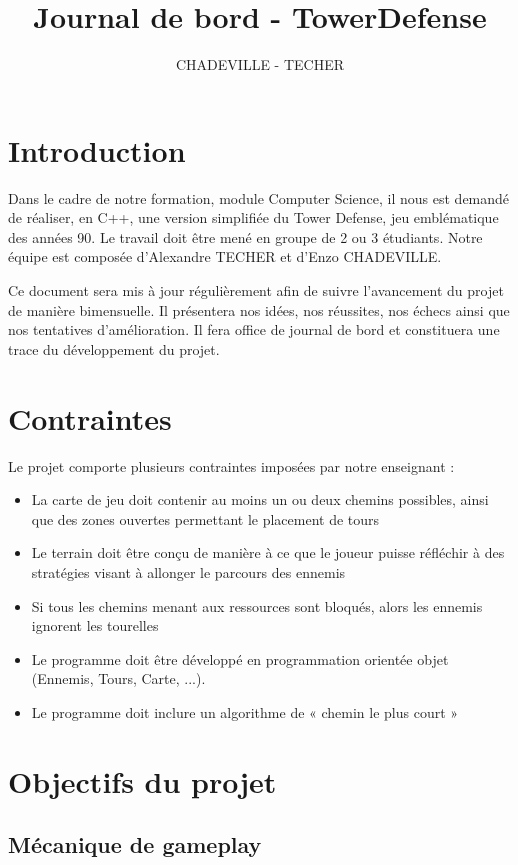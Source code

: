 \documentclass{article}
\title{Journal de bord - TowerDefense}
\author{CHADEVILLE - TECHER}
\begin{document}
\maketitle


\section{Introduction}

Dans le cadre de notre formation, module Computer Science, il nous est demandé de réaliser, en C++, une version simplifiée du Tower Defense, jeu emblématique des années 90. Le travail doit être mené en groupe de 2 ou 3 étudiants. Notre équipe est composée d’Alexandre TECHER et d’Enzo CHADEVILLE.

Ce document sera mis à jour régulièrement afin de suivre l’avancement du projet de manière bimensuelle. Il présentera nos idées, nos réussites, nos échecs ainsi que nos tentatives d’amélioration. Il fera office de journal de bord et constituera une trace du développement du projet.  

\section{Contraintes}
Le projet comporte plusieurs contraintes imposées par notre enseignant :

\begin{itemize}
\item La carte de jeu doit contenir au moins un ou deux chemins possibles, ainsi que des zones ouvertes permettant le placement de tours
\item Le terrain doit être conçu de manière à ce que le joueur puisse réfléchir à des stratégies visant à allonger le parcours des ennemis
\item Si tous les chemins menant aux ressources sont bloqués, alors les ennemis ignorent les tourelles
\item Le programme doit être développé en programmation orientée objet (Ennemis, Tours, Carte, ...).
\item Le programme doit inclure un algorithme de « chemin le plus court »
\end{itemize}

\newpage

\section{Objectifs du projet}

\subsection{Mécanique de gameplay}
\end{document}
